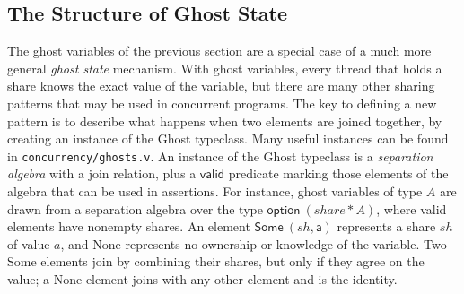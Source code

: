 \documentclass[11pt]{article}
\begin{document}
\subsection{The Structure of Ghost State}
The ghost variables of the previous section are a special case of a much more general \emph{ghost state} mechanism. With ghost variables, every thread that holds a share knows the exact value of the variable, but there are many other sharing patterns that may be used in concurrent programs. The key to defining a new pattern is to describe what happens when two elements are joined together, by creating an instance of the \textsf{Ghost} typeclass. Many useful instances can be found in \texttt{concurrency/ghosts.v}. An instance of the \textsf{Ghost} typeclass is a \emph{separation algebra} with a \textsf{join} relation, plus a $\mathsf{valid}$ predicate marking those elements of the algebra that can be used in assertions. For instance, ghost variables of type $A$ are drawn from a separation algebra over the type $\mathsf{option}\ (share * A)$, where valid elements have nonempty shares. An element $\mathsf{Some\ (\mathit{sh}, a)}$ represents a share $\mathit{sh}$ of value $a$, and \textsf{None} represents no ownership or knowledge of the variable. Two \textsf{Some} elements join by combining their shares, but only if they agree on the value; a \textsf{None} element joins with any other element and is the identity.
\end{document}

